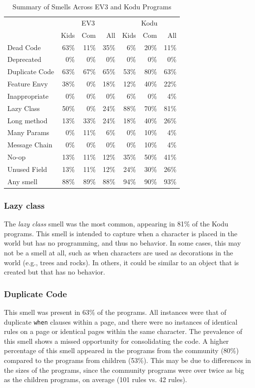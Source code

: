 \documentclass[conference]{IEEEtran}
\begin{document}
\begin{table}
\caption{Summary of Smells Across EV3 and Kodu Programs \label{tab:smellsummary}}
\begin{small}
\begin{center}
\begin{tabular}{| l || r r | r || r r | r||} \cline{2-7}
\multicolumn{1}{c||}{}&\multicolumn{3}{c||}{EV3}&\multicolumn{3}{c||}{Kodu}\\ \cline{2-7}
\multicolumn{1}{c||}{}& Kids & Com & All & Kids & Com & All \\ \hline
Dead Code&63\%&11\%&35\%&6\%&20\%&11\%\\
Deprecated  & 0\% & 0\%& 0\% & 0\%& 0\% & 0\%\\
Duplicate Code&63\%&67\%&65\%&53\%&80\%&63\%\\
Feature Envy&38\%&0\%&18\%&12\%&40\%&22\%\\
Inappropriate &0\%&0\%&0\%&6\%&0\%&4\%\\
Lazy Class&50\%&0\%&24\%&88\%&70\%&81\%\\
Long method&13\%&33\%&24\%&18\%&40\%&26\%\\
Many Params&0\%&11\%&6\%&0\%&10\%&4\%\\
Message Chain&0\%&0\%&0\%&0\%&10\%&4\%\\
No-op&13\%&11\%&12\%&35\%&50\%&41\%\\
Unused Field&13\%&11\%&12\%&24\%&30\%&26\%\\ \hline\hline
Any smell & 88\%&89\%&88\% & 94\%&90\%&93\% \\ \hline
\end{tabular}
\end{center}
\end{small}
\end{table}

\subsubsection{Lazy class}
The \emph{lazy class} smell was the most common, appearing in 81\% of the Kodu programs. This smell is intended to capture when a character is placed in the world but has no programming, and thus no behavior. In some cases, this may not be a smell at all, such as when characters are used as decorations in the world (e.g., trees and rocks). In others, it could be similar to an object that is created but that has no behavior. 

\subsubsection{Duplicate Code}
This smell was present in 63\% of the programs. All instances were that of duplicate {\tt when} clauses within a page, and there were no instances of identical rules on a page or identical pages within the same character. The prevalence of this smell shows a missed opportunity for consolidating the code. A higher percentage of this smell appeared in the programs from the community (80\%) compared to the programs from children (53\%). This may be due to differences in the sizes of the programs, since the community programs were over twice as big as the children programs, on average (101 rules vs. 42 rules). 
\end{document}
